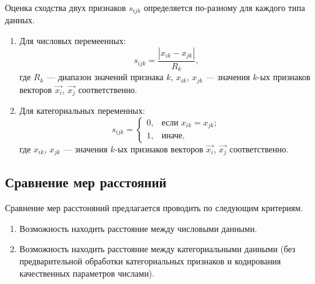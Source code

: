 Оценка сходства двух признаков $s_{ijk}$ определяется по-разному для каждого типа данных.

\begin{enumerate}
    \item Для числовых перемеенных:
    \begin{equation}
        s_{ijk} = \frac{|x_{ik} - x_{jk}|}{R_k},
    \end{equation}
    где $R_k$ --- диапазон значений признака $k$, $x_{ik}$, $x_{jk}$ --- значения $k$-ых признаков векторов $\vec{x_i}$, $\vec{x_j}$ соответственно.
    \item Для категориальных переменных:
    \begin{equation}
        s_{ijk} =
        \begin{cases}
            0, & \text{если $x_{ik} = x_{jk}$}; \\
            1, & \text{иначе},
        \end{cases}
    \end{equation}
    где $x_{ik}$, $x_{jk}$ --- значения $k$-ых признаков векторов $\vec{x_i}$, $\vec{x_j}$ соответственно.
\end{enumerate}

\subsection{Сравнение мер расстояний}

Сравнение мер расстоняний предлагается проводить по следующим критериям.

\begin{enumerate}
    \item Возможность находить расстояние между числовыми данными.
    \item Возможность находить расстояние между категориальными данными (без предварительной обработки категориальных признаков и кодирования качественных параметров числами).
\end{enumerate}

